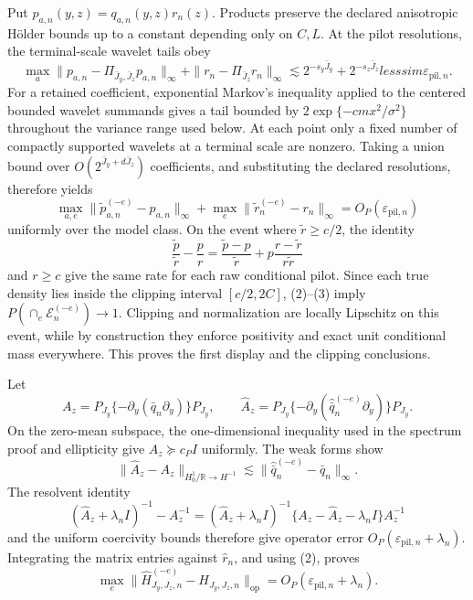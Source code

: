 Put \(p_{a,n}(y,z)=q_{a,n}(y,z)r_n(z)\).  Products preserve the declared anisotropic H\"older bounds up to a constant depending only on \(C,L\).  At the pilot resolutions, the terminal-scale wavelet tails obey
\[
\max_a\|p_{a,n}-\Pi_{\bar J_y,\bar J_z}p_{a,n}\|_\infty
+\|r_n-\Pi_{\bar J_z}r_n\|_\infty
\lesssim2^{-s_y\bar J_y}+2^{-s_z\bar J_z}lesssim\varepsilon_{\mathrm{pil},n}. \tag{1}
\]
For a retained coefficient, exponential Markov's inequality applied to the centered bounded wavelet summands gives a tail bounded by \(2\exp\{-c m x^2/\sigma^2\}\) throughout the variance range used below.  At each point only a fixed number of compactly supported wavelets at a terminal scale are nonzero.  Taking a union bound over \(O(2^{\bar J_y+d\bar J_z})\) coefficients, and substituting the declared resolutions, therefore yields
\[
\max_{a,e}\|\widetilde p_{a,n}^{(-e)}-p_{a,n}\|_\infty
+\max_e\|\widetilde r_n^{(-e)}-r_n\|_\infty
=O_P(\varepsilon_{\mathrm{pil},n})                                        \tag{2}
\]
uniformly over the model class.  On the event where \(\widetilde r\ge c/2\), the identity
\[
\frac{\widetilde p}{\widetilde r}-\frac p r
=\frac{\widetilde p-p}{\widetilde r}
+p\frac{r-\widetilde r}{r\widetilde r}                                   \tag{3}
\]
and \(r\ge c\) give the same rate for each raw conditional pilot.  Since each true density lies inside the clipping interval \([c/2,2C]\), (2)--(3) imply \(P(\cap_e\mathcal E_n^{(-e)})\to1\).  Clipping and normalization are locally Lipschitz on this event, while by construction they enforce positivity and exact unit conditional mass everywhere.  This proves the first display and the clipping conclusions.

Let
\[
A_z=P_{J_y}\{-\partial_y(\bar q_n\partial_y)\}P_{J_y},
\qquad
\widehat A_z=P_{J_y}\{-\partial_y(\widehat{\bar q}_n^{(-e)}\partial_y)\}P_{J_y}.
\]
On the zero-mean subspace, the one-dimensional inequality used in the spectrum proof and ellipticity give \(A_z\succeq c_P I\) uniformly.  The weak forms show
\[
\|\widehat A_z-A_z\|_{H^1_0/\mathbb R\to H^{-1}}
\lesssim\|\widehat{\bar q}_n^{(-e)}-\bar q_n\|_\infty.
\]
The resolvent identity
\[
(\widehat A_z+\lambda_nI)^{-1}-A_z^{-1}
=(\widehat A_z+\lambda_nI)^{-1}
\{A_z-\widehat A_z-\lambda_nI\}A_z^{-1}                                 \tag{4}
\]
and the uniform coercivity bounds therefore give operator error \(O_P(\varepsilon_{\mathrm{pil},n}+\lambda_n)\).  Integrating the matrix entries against \(\widehat r_n\), and using (2), proves
\[
\max_e\|\widehat H_{J_y,J_z,n}^{(-e)}-H_{J_y,J_z,n}\|_{\mathrm{op}}
=O_P(\varepsilon_{\mathrm{pil},n}+\lambda_n).
\]

